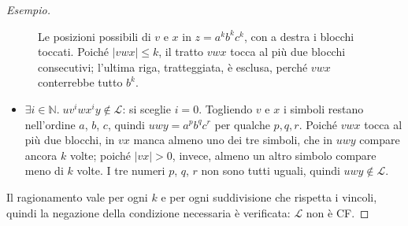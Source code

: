 \documentclass[a4paper, 11pt, oneside]{book}
\theoremstyle{formale}
\newenvironment{esempio}
    {\begin{proof}[\textit{Esempio}]\renewcommand{\qedsymbol}{$\diamond$}}
    {\end{proof}}
\begin{document}
\begin{esempio}
\begin{figure}[H]
            \caption{Le posizioni possibili di $v$ e $x$ in $z = a^k b^k c^k$, con a
                destra i blocchi toccati. Poich\'e $|vwx| \leq k$, il tratto $vwx$
                tocca al pi\`u due blocchi consecutivi; l'ultima riga, tratteggiata, \`e
                esclusa, perch\'e $vwx$ conterrebbe tutto $b^k$.}
            \label{fig:anbncn-casi}
        \end{figure}

        \begin{itemize}
            \item $\exists i \in \mathbb{N}.\; uv^i w x^i y \notin \mathcal{L}$: si
                sceglie $i = 0$. Togliendo $v$ e $x$ i simboli restano nell'ordine
                $a$, $b$, $c$, quindi $uwy = a^p b^q c^r$ per qualche $p, q, r$. Poich\'e
                $vwx$ tocca al pi\`u due blocchi, in $vx$ manca almeno uno dei tre
                simboli, che in $uwy$ compare ancora $k$ volte; poich\'e $|vx| > 0$,
                invece, almeno un altro simbolo compare meno di $k$ volte. I tre numeri
                $p$, $q$, $r$ non sono tutti uguali, quindi $uwy \notin \mathcal{L}$.
        \end{itemize}
        Il ragionamento vale per ogni $k$ e per ogni suddivisione che rispetta i vincoli,
        quindi la negazione della condizione necessaria \`e verificata: $\mathcal{L}$
        non \`e CF.
    \end{esempio}
\end{document}
